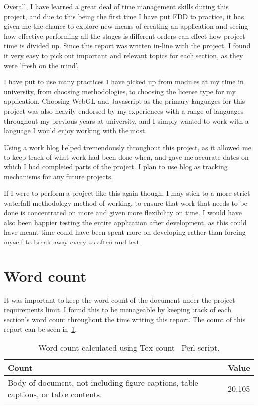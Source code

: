 Overall, I have learned a great deal of time management skills during this project, and due to this being the first time I have put FDD to practice, it has given me the chance to explore new means of creating an application and seeing how effective performing all the stages is different orders can effect how project time is divided up. Since this report was written in-line with the project, I found it very easy to pick out important and relevant topics for each section, as they were 'fresh on the mind'.

I have put to use many practices I have picked up from modules at my time in university, from choosing methodologies, to choosing the license type for my application. Choosing WebGL and Javascript as the primary languages for this project was also heavily endorsed by my experiences with a range of languages throughout my previous years at university, and I simply wanted to work with a language I would enjoy working with the most.

Using a work blog helped tremendously throughout this project, as it allowed me to keep track of what work had been done when, and gave me accurate dates on which I had completed parts of the project. I plan to use blog as tracking mechanisms for any future projects.

If I were to perform a project like this again though, I may stick to a more strict waterfall methodology method of working, to ensure that work that needs to be done is concentrated on more and given more flexibility on time. I would have also been happier testing the entire application after development, as this could have meant time could have been spent more on developing rather than forcing myself to break away every so often and test.

\clearpage

\section{Word count}
It was important to keep the word count of the document under the project requirements limit. I found this to be manageable by keeping track of each section's word count throughout the time writing this report. The count of this report can be seen in~\ref{tbl:count}.

\begin{table}[h!]
	\caption{Word count calculated using Tex-count~\cite{count} Perl script.}
	\begin{tabular}{|l|l|}
		\hline
		\textbf{Count} & \textbf{Value}                                                                \\ \hline
		Body of document, not including figure captions, table captions, or table contents.   &  20,105\\ \hline
	\end{tabular}
	\label{tbl:count}
\end{table}

